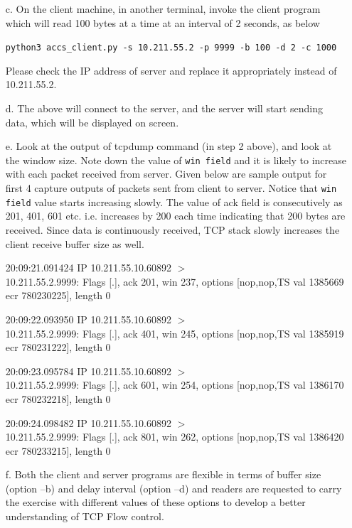 \begin{multicols}{2}
\begin{itemize}
\texttt{sudo tcpdump -n -i enp0s5 host 10.211.55.2 and port 9999}

Please check the Ethernet interface name and replace it appropriately instead of enp0s5.

\item[c.] On the client machine, in another terminal, invoke the client program which will read 100 bytes at a time at an interval of 2 seconds, as below

\texttt{python3 accs\_client.py -s 10.211.55.2 -p 9999 -b 100 -d 2 -c 1000}

Please check the IP address of server and replace it appropriately instead of 10.211.55.2.

\item[d.] The above will connect to the server, and the server will start sending data, which will be displayed on screen.

\item[e.] Look at the output of tcpdump command (in step 2 above), and look at the window size. Note down the value of \texttt{win field} and it is likely to increase with each packet received from server. Given below are sample output for first 4 capture outputs of packets sent from client to server. Notice that \texttt{win field} value starts increasing slowly. The value of ack field is consecutively as 201, 401, 601 etc. i.e. increases by 200 each time indicating that 200 bytes are received. Since data is continuously received, TCP stack slowly increases the client receive buffer size as well.

20:09:21.091424 IP 10.211.55.10.60892 $>$\\
10.211.55.2.9999: Flags [.], ack 201, win 237, options [nop,nop,TS val 1385669 ecr 780230225], length 0

20:09:22.093950 IP 10.211.55.10.60892 $>$\\ 10.211.55.2.9999: Flags [.], ack 401, win 245, options [nop,nop,TS val 1385919 ecr 780231222], length 0

20:09:23.095784 IP 10.211.55.10.60892 $>$\\ 10.211.55.2.9999: Flags [.], ack 601, win 254, options [nop,nop,TS val 1386170 ecr 780232218], length 0

20:09:24.098482 IP 10.211.55.10.60892 $>$\\ 10.211.55.2.9999: Flags [.], ack 801, win 262, options [nop,nop,TS val 1386420 ecr 780233215], length 0

\item[f.] Both the client and server programs are flexible in terms of buffer size (option –b) and delay interval (option –d) and readers are requested to carry the exercise with different values of these options to develop a better understanding of TCP Flow control.
\end{itemize}



\end{multicols}
